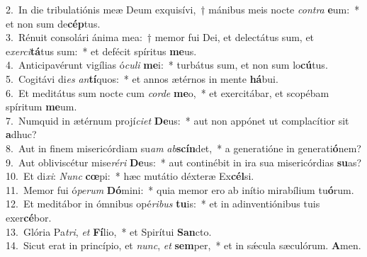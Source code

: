 {2.~}In die tribulatiónis meæ Deum exquisívi,~† mánibus meis nocte \textit{con}\textit{tra} \textbf{e}um:~* et non sum de\textbf{cép}tus.\\
{3.~}Rénuit consolári ánima mea:~† memor fui Dei, et delectátus sum, et e\textit{xer}\textit{ci}\textbf{tá}tus sum:~* et defécit spíritus \textbf{me}us.\\
{4.~}Anticipavérunt vigílias ó\textit{cu}\textit{li} \textbf{me}i:~* turbátus sum, et non sum lo\textbf{cú}tus.\\
{5.~}Cogitávi di\textit{es} \textit{an}\textbf{tí}quos:~* et annos ætérnos in mente \textbf{há}bui.\\
{6.~}Et meditátus sum nocte cum \textit{cor}\textit{de} \textbf{me}o,~* et exercitábar, et scopébam spíritum \textbf{me}um.\\
{7.~}Numquid in ætérnum projí\textit{ci}\textit{et} \textbf{De}us:~* aut non appónet ut complacítior sit \textbf{a}dhuc?\\
{8.~}Aut in finem misericórdiam su\textit{am} \textit{ab}\textbf{scín}det,~* a generatióne in generati\textbf{ó}nem?\\
{9.~}Aut obliviscétur mise\textit{ré}\textit{ri} \textbf{De}us:~* aut continébit in ira sua misericórdias \textbf{su}as?\\
{10.~}Et di\textit{xi}: \textit{Nunc} \textbf{cœ}pi:~* hæc mutátio déxteræ Ex\textbf{cél}si.\\
{11.~}Memor fui ó\textit{pe}\textit{rum} \textbf{Dó}mini:~* quia memor ero ab inítio mirabílium tu\textbf{ó}rum.\\
{12.~}Et meditábor in ómnibus opé\textit{ri}\textit{bus} \textbf{tu}is:~* et in adinventiónibus tuis exer\textbf{cé}bor.\\
{13.~}Glória Pa\textit{tri}, \textit{et} \textbf{Fí}lio,~* et Spirítui \textbf{San}cto.\\
{14.~}Sicut erat in princípio, et \textit{nunc}, \textit{et} \textbf{sem}per,~* et in sǽcula sæculórum. \textbf{A}men.\\
